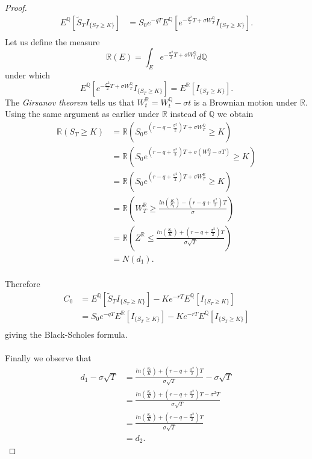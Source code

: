 \documentclass{article}
\theoremstyle{definition}
\theoremstyle{remark}
\newcommand{\measure}[1]{\ensuremath{\mathbb{#1}}}
\newcommand{\girsanov}[3]{\ensuremath{
	\measure{#1}(E)=\int_E e^{#2} d\measure{#3}
	}}
\newcommand{\I}[1]{\ensuremath{I_{\{#1\}}}}
\newcommand{\donebis}{\ensuremath{\frac{ln\left( \frac{S_0}{K}\right)+\left( r-q+\frac{\sigma^2}{2}\right)T}{\sigma\sqrt{T}}}}
\newcommand{\dtwo}{\ensuremath{\frac{ln\left( \frac{S_0}{K}\right)+\left( r-q-\frac{\sigma^2}{2}\right)T}{\sigma\sqrt{T}}}}
\begin{document}
\begin{proof}
\begin{align*}
E^\measure{Q}[\tilde{S}_T\I{S_T \geq K}]&=S_0e^{-qT}E^\measure{Q}\left[e^{-\frac{\sigma^2}{2}T+\sigma W_T^\measure{Q}} \I{S_T \geq K} \right].\\
\end{align*}
Let us define the measure 
$$\girsanov{R}{-\frac{\sigma^2}{2}T+\sigma W_T^\measure{Q}}{Q}$$
under which
$$E^\measure{Q}\left[e^{-\frac{\sigma^2}{2}T+\sigma W_T^\measure{Q}} \I{S_T \geq K} \right]=E^\measure{R}\left[\I{S_T \geq K} \right].$$
The \emph{Girsanov theorem} tells us that $W_t^\measure{R}=W_t^\measure{Q}-\sigma t$ is a Brownian motion under \measure{R}.
Using the same argument as earlier under \measure{R} instead of \measure{Q} we obtain
\begin{align*}
\measure{R}(S_T \geq K)&=\measure{R}\left(S_0e^{\left( r-q-\frac{\sigma^2}{2}\right)T+\sigma W_T^\measure{Q}} \geq K\right)\\
&=\measure{R}\left(S_0e^{\left( r-q+\frac{\sigma^2}{2}\right)T+\sigma (W_T^\measure{Q}-\sigma T)} \geq K\right)\\
&=\measure{R}\left(S_0e^{\left( r-q+\frac{\sigma^2}{2}\right)T+\sigma W_T^\measure{R}} \geq K\right)\\
&=\measure{R}\left(W_T^\measure{R} \geq \frac{ln\left( \frac{K}{S_0}\right)-\left( r-q+\frac{\sigma^2}{2}\right)T}{\sigma}\right)\\
&=\measure{R}\left(Z^\measure{R} \leq \donebis \right)\\
&=N(d_1).\\
\end{align*}

Therefore
\begin{align*}
C_0&=E^\measure{Q}[\tilde{S}_T\I{S_T \geq K}]-Ke^{-rT}E^\measure{Q}[\I{S_T \geq K}]\\
&=S_0e^{-qT}E^\measure{R}\left[\I{S_T \geq K} \right]-Ke^{-rT}E^\measure{Q}[\I{S_T \geq K}]\\
\end{align*}
giving the Black-Scholes formula.\\
\\
Finally we observe that
\begin{align*}
d_1-\sigma \sqrt{T}&=\donebis -\sigma \sqrt{T}\\
&=\frac{ln\left( \frac{S_0}{K}\right)+\left( r-q+\frac{\sigma^2}{2}\right)T-\sigma^2 T}{\sigma\sqrt{T}}\\
&=\dtwo \\
&=d_2.
\end{align*}
\end{proof}
\end{document}

